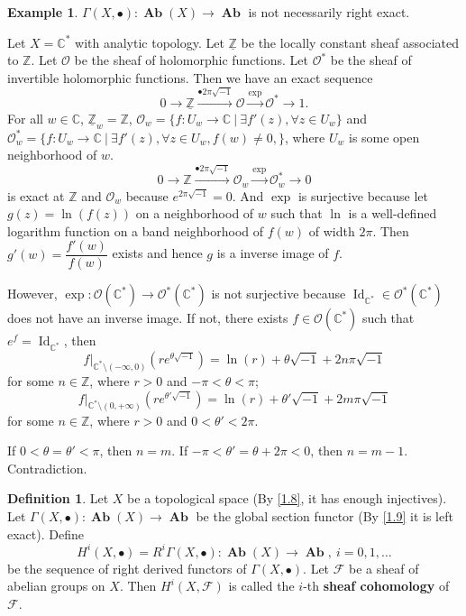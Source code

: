 \documentclass{amsart}
\numberwithin{equation}{section}
\theoremstyle{plain}
\theoremstyle{definition}
\newtheorem{defn}[equation]{Definition}
\newtheorem{eg}[equation]{Example}
\DeclareMathOperator{\Ab}{\mathbf{Ab}}
\DeclareMathOperator{\Id}{Id}
\begin{document}
\begin{eg}\label{1.10}
	$ \Gamma(X,\bullet):\Ab(X)\to \Ab $ is not necessarily right exact. 
	
	Let $ X=\mathbb C^*$ with analytic topology. 
	Let $ \underline{\mathbb Z} $ be the locally constant sheaf associated to $ \mathbb Z $. 
	Let $ \mathcal O $ be the sheaf of holomorphic functions. 
	Let $ \mathcal O^* $ be the sheaf of invertible holomorphic functions. 
	Then we have an exact sequence 
	\[0\to \underline{\mathbb Z}\xrightarrow{\bullet 2\pi\sqrt{-1}}\mathcal O\xrightarrow{\exp}\mathcal O^*\to 1.\]
	For all $ w\in\mathbb C $, $ \underline{\mathbb Z}_w=\mathbb Z $, $ \mathcal O_w= \{f:U_w\to \mathbb C~|~\exists f'(z),\forall z\in U_w\}$ and $ \mathcal O^*_w= \{f:U_w\to \mathbb C~|~\exists f'(z), \forall z\in U_w, f(w)\ne 0, \}$, where $ U_w $ is some open neighborhood of $ w $. 
	\[0\to \mathbb Z\xrightarrow{\bullet 2\pi\sqrt{-1}}\mathcal O_w\xrightarrow{\exp}\mathcal O^*_w\to 0\]
	is exact at $ \mathbb Z $ and $ \mathcal O_w $ because $ e^{2\pi \sqrt{-1}}=0 $. 
	And $ \exp $ is surjective because let $ g(z)=\ln(f(z)) $ on a neighborhood of $ w $ such that $ \ln $ is a well-defined logarithm function on a band neighborhood of $ f(w) $ of width $ 2\pi $. 
	Then $ g'(w)=\dfrac{f'(w)}{f(w)} $ exists and hence $ g $ is a inverse image of $ f $. 
	
	However, $ \exp:\mathcal O(\mathbb C^*)\to \mathcal O^*(\mathbb C^*) $ is not surjective because $ \Id_{\mathbb C^*}\in \mathcal O^*(\mathbb C^*) $ does not have an inverse image. 
	If not, there exists $ f\in \mathcal O(\mathbb C^*) $ such that $ e^f=\Id_{\mathbb C^*} $, then $$ f|_{\mathbb C^*\setminus(-\infty,0)}(re^{\theta\sqrt{-1}})=\ln(r)+\theta\sqrt{-1}+2n\pi\sqrt{-1} $$ for some $ n\in\mathbb Z $, where $ r>0 $ and $ -\pi< \theta<\pi $; $$ f|_{\mathbb C^*\setminus(0,+\infty)}(re^{\theta'\sqrt{-1}})=\ln(r)+\theta'\sqrt{-1}+2m\pi\sqrt{-1} $$ for some $ n\in\mathbb Z $, where $ r>0 $ and $ 0< \theta'<2\pi $. 
	
	If $0<\theta=\theta'<\pi $, then $ n=m $. 
	If $-\pi<\theta'=\theta+2\pi<0 $, then $ n=m-1 $. 
	Contradiction.%
\end{eg}

\begin{defn}\label{1.11}
	Let $ X $ be a topological space (By \cref{1.8}, it has enough injectives). 
	Let $ \Gamma(X,\bullet):\Ab(X)\to \Ab $ be the global section functor (By \cref{1.9} it is left exact). 
	Define $$ H^i(X, \bullet)=R^i\Gamma(X,\bullet):\Ab(X)\to \Ab ,~ i=0,1,\ldots $$ be the sequence of right derived functors of $ \Gamma(X,\bullet) $. 
	Let $ \mathscr F $ be a sheaf of abelian groups on $ X $. 
	Then $ H^i(X, \mathscr F) $ is called the $ i $-th \textbf{sheaf cohomology} of $ \mathscr F $. 
\end{defn}
\end{document}

